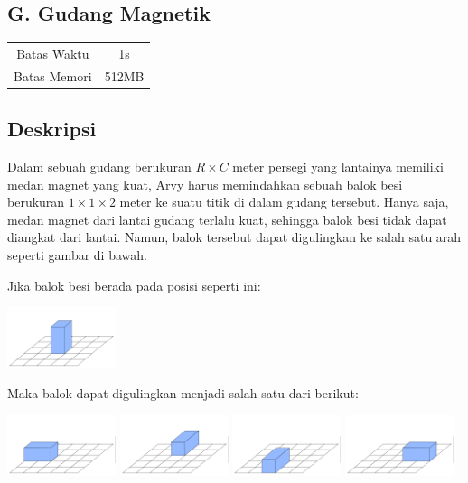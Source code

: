 \documentclass{article}
\begin{document}
\begin{center}
    \section*{G. Gudang Magnetik}

    \begin{tabular}{ | c c | }
        \hline
        Batas Waktu  & 1s \\
        Batas Memori & 512MB \\
        \hline
    \end{tabular}
\end{center}

\subsection*{Deskripsi}
Dalam sebuah gudang berukuran $R \times C$ meter persegi yang lantainya memiliki medan magnet yang kuat, Arvy harus memindahkan sebuah balok besi berukuran $1 \times 1 \times 2$ meter ke suatu titik di dalam gudang tersebut.
Hanya saja, medan magnet dari lantai gudang terlalu kuat, sehingga balok besi tidak dapat diangkat dari lantai.
Namun, balok tersebut dapat digulingkan ke salah satu arah seperti gambar di bawah.

Jika balok besi berada pada posisi seperti ini:

\begin{center}
    \includegraphics[width=120px]{balok-1-awal}
\end{center}

Maka balok dapat digulingkan menjadi salah satu dari berikut:

\includegraphics[width=120px]{balok-1-kiri}
\includegraphics[width=120px]{balok-1-belakang}
\includegraphics[width=120px]{balok-1-depan}
\includegraphics[width=120px]{balok-1-kanan}
\end{document}
